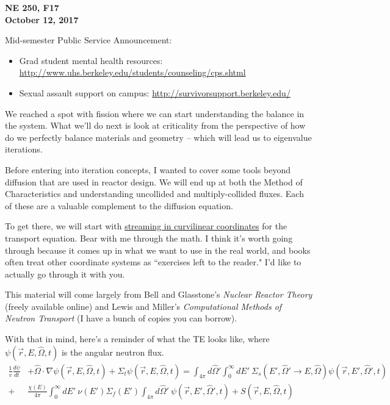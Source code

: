 \documentclass[12pt]{article}
\newcommand{\vOmega}{\ensuremath{\hat{\Omega}}}
\begin{document}
\begin{center}
{\bf NE 250, F17\\
October 12, 2017 
}
\end{center}

Mid-semester Public Service Announcement: 
\begin{itemize}
\item Grad student mental health resources: \url{http://www.uhs.berkeley.edu/students/counseling/cps.shtml}
\item Sexual assault support on campus: \url{http://survivorsupport.berkeley.edu/}
\end{itemize}

We reached a spot with fission where we can start understanding the balance in the system. What we'll do next is look at criticality from the perspective of how do we perfectly balance materials and geometry -- which will lead us to eigenvalue iterations. 

Before entering into iteration concepts, I wanted to cover some tools beyond diffusion that are used in reactor design. We will end up at both the Method of Characteristics and understanding uncollided and multiply-collided fluxes. Each of these are a valuable complement to the diffusion equation. 

To get there, we will start with \underline{streaming in curvilinear coordinates} for the transport equation. Bear with me through the math. I think it's worth going through because it comes up in what we want to use in the real world, and books often treat other coordinate systems as ``exercises left to the reader." I'd like to actually go through it with you.

This material will come largely from Bell and Glasstone's \textit{Nuclear Reactor Theory} (freely available online) and Lewis and Miller's \textit{Computational Methods of Neutron Transport} (I have a bunch of copies you can borrow). 

With that in mind, here's a reminder of what the TE looks like, where $\psi(\vec{r}, E, \vOmega, t)$ is the angular neutron flux. 
%
\begin{align*}
\frac{1}{v} \frac{d \psi}{dt} &+ \vOmega \cdot \nabla \psi(\vec{r}, E, \vOmega, t) + \Sigma_t \psi(\vec{r}, E, \vOmega, t) = \int_{4 \pi} d\vOmega' \int_0^{\infty} dE' \: \Sigma_s(E', \vOmega' \rightarrow E, \vOmega) \psi(\vec{r}, E', \vOmega', t)\\
 +& \frac{\chi(E)}{4 \pi}\int_0^{\infty} dE' \: \nu(E') \Sigma_f(E') \int_{4 \pi} d\vOmega' \:\psi(\vec{r}, E', \vOmega', t) + S(\vec{r}, E, \vOmega, t)
\end{align*}
\end{document}
